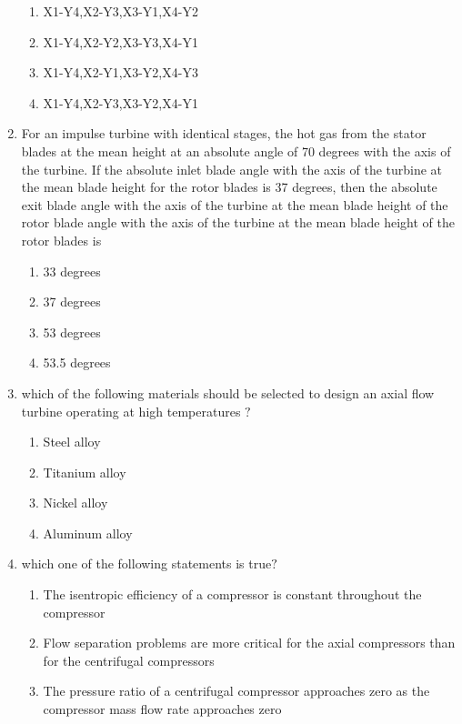 \documentclass[journal]{IEEEtran}
\begin{document}
\begin{enumerate}[start=35]
\begin{enumerate}
    \item X1-Y4,X2-Y3,X3-Y1,X4-Y2
    \item X1-Y4,X2-Y2,X3-Y3,X4-Y1
    \item X1-Y4,X2-Y1,X3-Y2,X4-Y3
    \item X1-Y4,X2-Y3,X3-Y2,X4-Y1
\end{enumerate}
\item For an impulse turbine with identical stages, the hot gas from the stator blades at the mean height at an absolute angle of 70 degrees with the axis of the turbine. If the absolute inlet blade angle with the axis of the turbine at the mean blade height for the rotor blades is 37 degrees, then the absolute exit blade angle with the axis of the turbine at the mean blade height of the rotor blade angle with the axis of the turbine at the mean blade height of the rotor blades is
\begin{multicols}{4}
    \begin{enumerate}
        \item 33 degrees
        \item 37 degrees
        \item 53 degrees
        \item 53.5 degrees
    \end{enumerate}
\end{multicols}
\item which of the following materials should be selected to design an axial flow turbine operating at high temperatures $?$
\begin{multicols}{2}
    \begin{enumerate}
        \item Steel alloy
        \item Titanium alloy
        \item Nickel alloy 
        \item Aluminum alloy
    \end{enumerate}
\end{multicols}
\item which one of the following statements is true$?$
\begin{enumerate}
        \item The isentropic efficiency of a compressor is constant throughout the compressor 
        \item Flow separation problems are more critical for the axial compressors than for the centrifugal compressors
        \item The pressure ratio of a centrifugal compressor approaches zero as the compressor mass flow rate approaches zero

\end{enumerate}
\end{enumerate}
\end{document}
